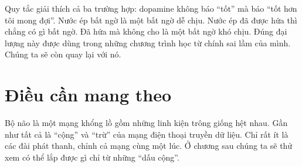 Quy tắc giải thích cả ba trường hợp: dopamine không báo ``tốt'' mà báo ``tốt hơn tôi mong đợi''. Nước ép bất ngờ là một bất ngờ dễ chịu. Nước ép đã được hứa thì chẳng có gì bất ngờ. Đã hứa mà không cho là một bất ngờ khó chịu. Đúng đại lượng này được dùng trong những chương trình học từ chính sai lầm của mình. Chúng ta sẽ còn quay lại với nó.

\section*{Điều cần mang theo}

Bộ não là một mạng khổng lồ gồm những linh kiện trông giống hệt nhau. Gần như tất cả là ``cộng'' và ``trừ'' của mạng điện thoại truyền dữ liệu. Chỉ rất ít là các đài phát thanh, chỉnh cả mạng cùng một lúc. Ở chương sau chúng ta sẽ thử xem có thể lắp được gì chỉ từ những ``dấu cộng''.

